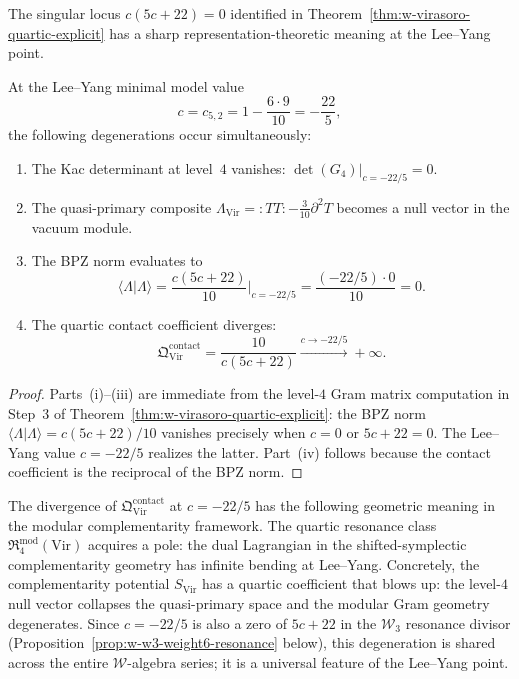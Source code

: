 The singular locus $c(5c+22)=0$ identified in
Theorem~\ref{thm:w-virasoro-quartic-explicit} has a sharp
representation-theoretic meaning at the Lee--Yang point.

\begin{proposition}
\label{prop:w-virasoro-lee-yang-degeneration}
At the Lee--Yang minimal model value
\begin{equation}
\label{eq:lee-yang-central-charge}
c = c_{5,2} = 1 - \frac{6\cdot 9}{10} = -\frac{22}{5},
\end{equation}
the following degenerations occur simultaneously:
\begin{enumerate}[label=\textup{(\roman*)}]
\item The Kac determinant at level~$4$ vanishes:
  $\det(G_4)\big|_{c=-22/5} = 0$.
\item The quasi-primary composite
  $\Lambda_{\mathrm{Vir}} = {:}TT{:} - \tfrac{3}{10}\partial^2 T$
  becomes a null vector in the vacuum module.
\item The BPZ norm evaluates to
  \[
  \langle\Lambda|\Lambda\rangle
  = \frac{c(5c+22)}{10}\bigg|_{c=-22/5}
  = \frac{(-22/5)\cdot 0}{10} = 0.
  \]
\item The quartic contact coefficient diverges:
  \[
  \mathfrak Q^{\mathrm{contact}}_{\mathrm{Vir}}
  = \frac{10}{c(5c+22)}
  \xrightarrow{c\to -22/5} +\infty.
  \]
\end{enumerate}
\end{proposition}

\begin{proof}
Parts~(i)--(iii) are immediate from the level-$4$ Gram matrix
computation in Step~3 of
Theorem~\ref{thm:w-virasoro-quartic-explicit}: the BPZ norm
$\langle\Lambda|\Lambda\rangle = c(5c+22)/10$ vanishes precisely when
$c=0$ or $5c+22=0$.  The Lee--Yang value $c=-22/5$ realizes the
latter.  Part~(iv) follows because the contact coefficient is the
reciprocal of the BPZ norm.\qedhere
\end{proof}

\begin{remark}
\label{rem:w-lee-yang-lagrangian-degeneration}
The divergence of $\mathfrak Q^{\mathrm{contact}}_{\mathrm{Vir}}$
at $c=-22/5$ has the following geometric meaning in the modular
complementarity framework.  The quartic resonance class
$\mathfrak R^{\mathrm{mod}}_4(\mathrm{Vir})$ acquires a pole:
the dual Lagrangian in the shifted-symplectic complementarity
geometry has infinite bending at Lee--Yang.  Concretely, the
complementarity potential $S_{\mathrm{Vir}}$ has a quartic
coefficient that blows up: the
level-$4$ null vector collapses the quasi-primary space and the
modular Gram geometry degenerates.  Since $c=-22/5$ is also a
zero of $5c+22$ in the $\mathcal{W}_3$ resonance divisor
(Proposition~\ref{prop:w-w3-weight6-resonance} below), this
degeneration is shared across the entire $\mathcal{W}$-algebra
series; it is a universal feature of the Lee--Yang point.
\end{remark}

